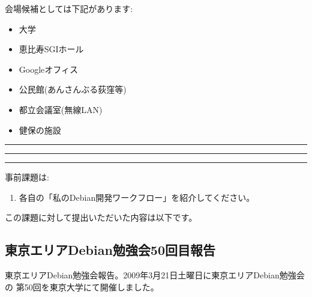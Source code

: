 \documentclass[mingoth,a4paper]{jsarticle}
\begin{document}
\begin{multicols}{2}
 会場候補としては下記があります:

 \begin{itemize}
  \item 大学
  \item 恵比寿SGIホール
  \item Googleオフィス
  \item 公民館(あんさんぶる荻窪等)
  \item 都立会議室(無線LAN)
  \item 健保の施設
 \end{itemize}

\end{multicols}


\newpage

\begin{minipage}[b]{0.2\hsize}
 \colorbox{titleback}{}
\end{minipage}
\begin{minipage}[b]{0.8\hsize}
\hrule
\vspace{2mm}
\hrule
%
%
\setcounter{tocdepth}{1}
\tableofcontents
\vspace{2mm}
\hrule
\end{minipage}


事前課題は:

\begin{enumerate}
 \item 各自の「私のDebian開発ワークフロー」を紹介してください。
\end{enumerate}

この課題に対して提出いただいた内容は以下です。

\begin{multicols}{2}

\end{multicols}

%
%

\subsection{東京エリアDebian勉強会50回目報告}

東京エリアDebian勉強会報告。2009年3月21日土曜日に東京エリアDebian勉強会の
第50回を東京大学にて開催しました。
\end{document}
